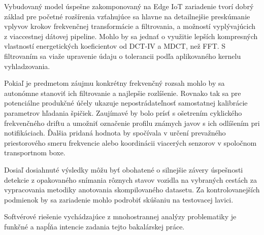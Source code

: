 Vybudovaný model úspešne zakomponovaný na Edge IoT zariadenie tvorí dobrý základ pre početné rozšírenia
vzťahujúce sa hlavne na detailnejšie preskúmanie vplyvov krokov frekvenčnej transformácie a filtrovania,
a možností vyplývajúcich z viaccestnej dátovej pipeline. Mohlo by sa jednať o využitie lepších kompresných vlastností
energetických koeficientov od DCT-IV a MDCT, než FFT. S filtrovaním sa viaže upravenie údaju o tolerancii podľa
aplikovaného kernelu vyhladzovania.

Pokiaľ je predmetom záujmu konkrétny frekvenčný rozsah mohlo by sa autonómne stanoviť ich filtrovanie a najlepšie rozlíšenie.
Rovnako tak sa pre potenciálne produkčné účely ukazuje nepostrádateľnosť samostatnej kalibrácie parametrov hľadania špičiek.
Zaujímavé by bolo prísť s ošetrením cyklického frekvenčného driftu a umožniť označenie profilu známych javov s ich odlíšením pri
notifikáciach. Ďalšia pridaná hodnota by spočívala v určení prevažného priestorového smeru frekvencie alebo koordinácii viacerých senzorov
v spoločnom transportnom boxe.

Dosiaľ dosiahnuté výsledky môžu byť obohatené o silnejšie závery úspešnosti detekcie z opakovaného snímania rôznych stavov
vozidla na vybraných cestách za vypracovania metodiky anotovania skompilovaného datasetu. Za kontrolovanejších podmienok
by sa zariadenie mohlo podrobiť skúšaniu na testovacej lavici.

Softvérové riešenie vychádzajúce z mnohostrannej analýzy problematiky je funkčné a napĺňa intencie
zadania tejto bakalárskej práce.
\cleardoublepage
